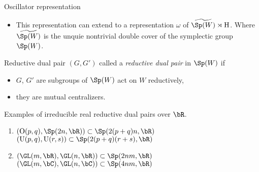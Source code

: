 \documentclass[final,hyperref={pdfpagelabels=false}]{beamer} %
\begin{document}
\begin{frame}
\begin{minipage}[t]{.48\linewidth}
\begin{block}{Oscillator representation}
\begin{itemize}
        \item This representation can extend to a representation $\omega$ of 
          $\widetilde{\Sp(W)}\rtimes \mathrm{H}$. Where 
          $\widetilde{\Sp(W)}$ is the unquie nontrivial double cover of the symplectic group $\Sp(W)$.
        \end{itemize}
      \end{block}
      \vfill
      \begin{block}{Reductive dual pair}
        $(G,G')$ called a {\em reductive dual pair} in $\Sp(W)$ if
        \begin{itemize}
        \item $G$, $G'$  are subgroups of $\Sp(W)$ act on $W$ reductively,
        \item they are mutual centralizers.
        \end{itemize}
        Examples of irreducible real reductive dual pairs over $\bR$.
        \begin{enumerate}[Type I]
        \item 
           $(\mathrm{O}(p,q), \Sp(2n,\bR))\subset \Sp(2(p+q)n,\bR)$\\
           $(\mathrm{U}(p,q), \mathrm{U}(r,s))\subset \Sp(2(p+q)(r+s),\bR)$
        \item  $(\GL(m,\bR),\GL(n,\bR))\subset \Sp(2nm,\bR)$\\
          $(\GL(m,\bC),\GL(n,\bC))\subset \Sp(4nm,\bR)$
        \end{enumerate}
      \end{block}


\end{minipage}
\end{frame}
\end{document}
